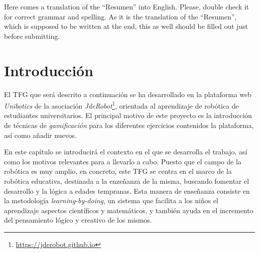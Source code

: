 \documentclass[a4paper, 12pt]{book}
\begin{document}
Here comes a translation of the ``Resumen'' into English. 
Please, double check it for correct grammar and spelling.
As it is the translation of the ``Resumen'', which is supposed to be written at the end, this as well should be filled out just before submitting.




\tableofcontents 
\cleardoublepage
\listoffigures %



\cleardoublepage
\chapter{Introducción}
\label{sec:intro} %

El TFG que será descrito a continuación se ha desarrollado en la plataforma web \textit{Unibotics} de la asociación \textit{JdeRobot}\footnote{\url{https://jderobot.github.io}}, orientada al aprendizaje de robótica de estudiantes universitarios. El principal motivo de este proyecto es la introducción de técnicas de \emph{gamificación} para los diferentes ejercicios contenidos la plataforma, así como añadir nuevos.

En este capítulo se introducirá el contexto en el que se desarrolla el trabajo, así como los motivos relevantes para a llevarlo a cabo. Puesto que el campo de la robótica es muy amplio, en concreto, este TFG se centra en el marco de la robótica educativa, destinada a la enzeñanza de la misma, buscando fomentar el desarrollo y la lógica a edades tempranas. Esta manera de enseñanza consiste en la metodología \emph{learning-by-doing}, un sistema que facilita a los niños el aprendizaje aspectos científicos y matemáticos, y también ayuda en el incremento del pensamiento lógico y creativo de los mismos.
\end{document}
